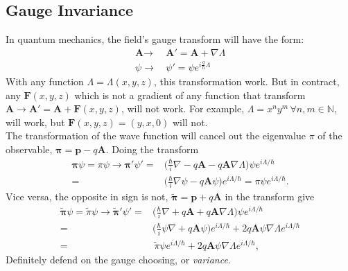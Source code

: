 \documentclass[unnumsec,webpdf,modern,large]{mam-authoring-template}%
\theoremstyle{thmstyleone}%
\theoremstyle{thmstyletwo}%
\theoremstyle{thmstylethree}%
\begin{document}
\begin{appendices}
\section{Gauge Invariance}\label{gauge invariance}
\quad In quantum mechanics, the field's gauge transform will have the form:
\begin{align*}
	\textbf{A} \to&\,\textbf{A}'= \textbf{A} + \nabla \Lambda\\
	\psi \to&\,\psi' = \psi e^{i\frac{q}{\hbar}\Lambda}
\end{align*}
\quad With any function \(\Lambda = \Lambda (x,y,z)\), this transformation work. But in contract, any \(\textbf{F}(x,y,z)\) which is not a gradient of any function that transform \(\textbf{A} \to \textbf{A}' =  \textbf{A} + \textbf{F}(x,y,z)\), will not work. For example, \(\Lambda = x^ny^m \,\forall n,m \in \mathbb{N}\), will work, but \(\textbf{F}(x,y,z) = (y,x,0)\) will not.\\
\null\quad The transformation of the wave function will cancel out the eigenvalue \(\pi\) of the observable, \(\bm{\pi} = \textbf{p} - q\textbf{A}\). Doing the transform
\begin{align*}
	\bm{\pi} \psi= \pi \psi \to \bm{\pi'} \psi'=& \bigg(\frac{\hbar}{i} \nabla - q\textbf{A} - q \textbf{A}\nabla \Lambda\bigg)\psi e^{i\Lambda/\hbar}\\
=& \bigg(\frac{\hbar}{i} \nabla \psi - q\textbf{A}\psi\bigg) e^{i\Lambda/\hbar} =\pi \psi e^{i\Lambda/\hbar}.
\end{align*}
\quad Vice versa, the opposite in sign is not, \(\tilde{\bm{\pi}} = \textbf{p} + q \textbf{A}\) in the transform give
\begin{align*}
	\tilde{\bm{\pi}} \psi = \tilde{\pi} \psi\to 	\tilde{\bm{\pi}}' \psi' =& \bigg(\frac{\hbar}{i} \nabla + q\textbf{A} + q \textbf{A}\nabla \Lambda\bigg)\psi e^{i\Lambda/\hbar}\\
	=& \bigg(\frac{\hbar}{i}\psi \nabla + q\textbf{A}\psi\bigg)e^{i\Lambda/\hbar} + 2 q \textbf{A}\psi\nabla \Lambda e^{i\Lambda/\hbar}\\
	=& \,\tilde{\pi}\psi e^{i\Lambda/\hbar} + 2 q \textbf{A}\psi\nabla \Lambda e^{i\Lambda/\hbar},
\end{align*}
\quad Definitely defend on the gauge choosing, or \textit{variance}.
	\end{appendices}
	
	
\end{document}
